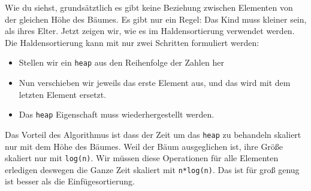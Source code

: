 Wie du siehst, grundsätztlich es gibt keine Beziehung zwischen Elementen von der 
gleichen Höhe des Bäumes. Es gibt nur ein Regel: Das Kind muss kleiner sein, als ihres
Elter. Jetzt zeigen wir, wie es im Haldensortierung verwendet werden.
Die Haldensortierung kann mit nur zwei Schritten formuliert werden:
\begin{itemize}
\item Stellen wir ein \texttt{heap} aus den Reihenfolge der Zahlen her
\item Nun verschieben wir jeweils das erste Element aus, und das wird mit dem letzten Element 
ersetzt.
\item Das \texttt{heap} Eigenschaft muss wiederhergestellt werden.
\end{itemize}

Das Vorteil des Algorithmus ist dass der Zeit um das \texttt{heap} zu behandeln skaliert
nur mit dem Höhe des Bäumes. Weil der Bäum ausgeglichen ist, ihre Größe skaliert nur mit
\texttt{log(n)}. Wir müssen diese Operationen für alle Elementen erledigen 
deswegen die Ganze Zeit skaliert mit \texttt{n*log(n)}. Das ist für groß genug  ist
besser als die Einfügesortierung.

